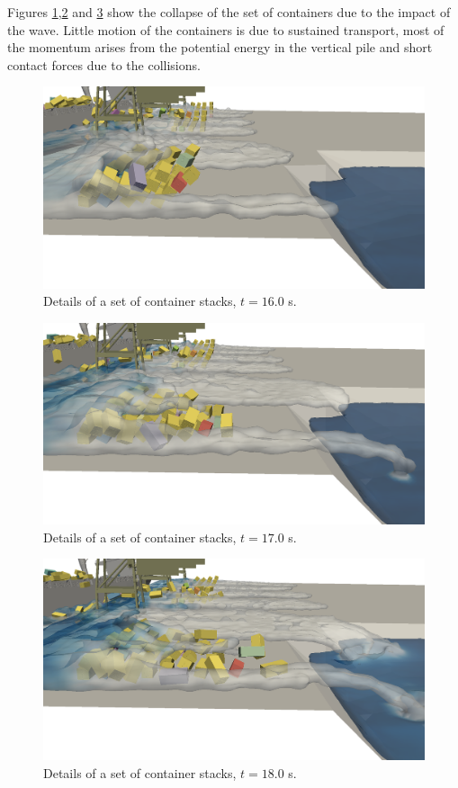 Figures \ref{fig:cont_t80},\ref{fig:cont_t85} and \ref{fig:cont_t90} show the collapse of the set of containers due to the impact of the wave. Little motion of the containers is due to sustained transport, most of the momentum arises from the potential energy in the vertical pile and short contact forces due to the collisions. 
%
\begin{figure}[H]
	\centering
	\includegraphics[width=0.95\linewidth]{Figures/6.Chapter/cont_t80} 
	\caption{Details of a set of container stacks, $t=16.0$ s.}
	\label{fig:cont_t80} 
\end{figure}
%
%
\begin{figure}[H]
	\centering
	\includegraphics[width=0.95\linewidth]{Figures/6.Chapter/cont_t85} 
	\caption{Details of a set of container stacks, $t=17.0$ s.}
	\label{fig:cont_t85} 
\end{figure}
%
%
\begin{figure}[H]
	\centering
	\includegraphics[width=0.95\linewidth]{Figures/6.Chapter/cont_t90} 
	\caption{Details of a set of container stacks, $t=18.0$ s.}
	\label{fig:cont_t90} 
\end{figure}
%


